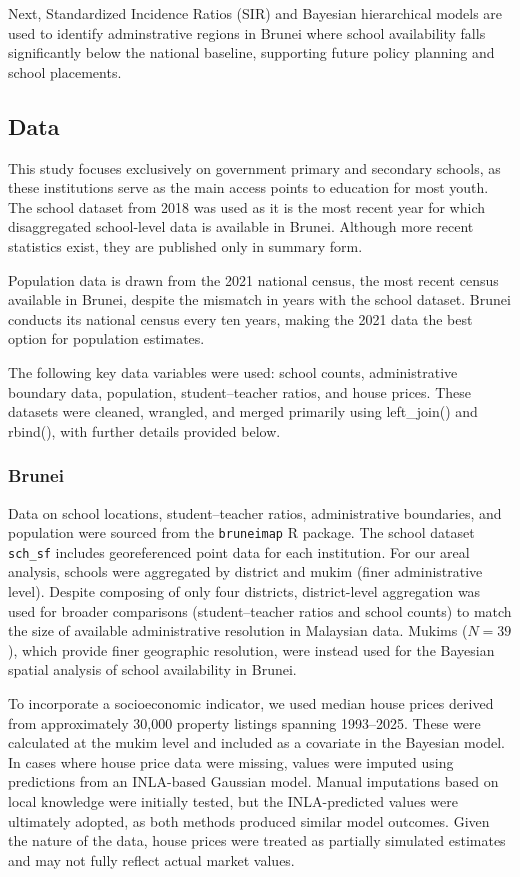 \documentclass[
  letterpaper,
  DIV=11,
  numbers=noendperiod]{scrartcl}
\begin{document}
Next, Standardized Incidence Ratios (SIR) and Bayesian hierarchical
models are used to identify adminstrative regions in Brunei where school
availability falls significantly below the national baseline, supporting
future policy planning and school placements.

\subsection{Data}\label{data}

This study focuses exclusively on government primary and secondary
schools, as these institutions serve as the main access points to
education for most youth. The school dataset from 2018 was used as it is
the most recent year for which disaggregated school-level data is
available in Brunei. Although more recent statistics exist, they are
published only in summary form.

Population data is drawn from the 2021 national census, the most recent
census available in Brunei, despite the mismatch in years with the
school dataset. Brunei conducts its national census every ten years,
making the 2021 data the best option for population estimates.

The following key data variables were used: school counts,
administrative boundary data, population, student--teacher ratios, and
house prices. These datasets were cleaned, wrangled, and merged
primarily using left\_join() and rbind(), with further details provided
below.

\subsubsection{Brunei}\label{brunei}

Data on school locations, student--teacher ratios, administrative
boundaries, and population were sourced from the \texttt{bruneimap} R
package. The school dataset \texttt{sch\_sf} includes georeferenced
point data for each institution. For our areal analysis, schools were
aggregated by district and mukim (finer administrative level). Despite
composing of only four districts, district-level aggregation was used
for broader comparisons (student--teacher ratios and school counts) to
match the size of available administrative resolution in Malaysian data.
Mukims (\(N = 39\)), which provide finer geographic resolution, were
instead used for the Bayesian spatial analysis of school availability in
Brunei.

To incorporate a socioeconomic indicator, we used median house prices
derived from approximately 30,000 property listings spanning 1993--2025.
These were calculated at the mukim level and included as a covariate in
the Bayesian model. In cases where house price data were missing, values
were imputed using predictions from an INLA-based Gaussian model. Manual
imputations based on local knowledge were initially tested, but the
INLA-predicted values were ultimately adopted, as both methods produced
similar model outcomes. Given the nature of the data, house prices were
treated as partially simulated estimates and may not fully reflect
actual market values.
\end{document}
